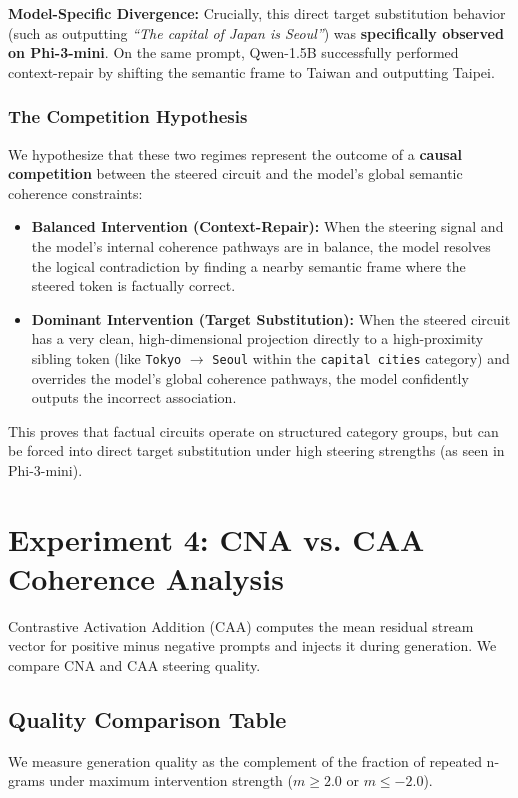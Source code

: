 \documentclass[11pt]{article}
\begin{document}
\textbf{Model-Specific Divergence:} Crucially, this direct target substitution behavior (such as outputting \textit{``The capital of Japan is Seoul''}) was \textbf{specifically observed on Phi-3-mini}. On the same prompt, Qwen-1.5B successfully performed context-repair by shifting the semantic frame to Taiwan and outputting Taipei.

\subsubsection{The Competition Hypothesis}
We hypothesize that these two regimes represent the outcome of a \textbf{causal competition} between the steered circuit and the model's global semantic coherence constraints:
\begin{itemize}
    \item \textbf{Balanced Intervention (Context-Repair):} When the steering signal and the model's internal coherence pathways are in balance, the model resolves the logical contradiction by finding a nearby semantic frame where the steered token is factually correct.
    \item \textbf{Dominant Intervention (Target Substitution):} When the steered circuit has a very clean, high-dimensional projection directly to a high-proximity sibling token (like \texttt{Tokyo} $\rightarrow$ \texttt{Seoul} within the \texttt{capital cities} category) and overrides the model's global coherence pathways, the model confidently outputs the incorrect association.
\end{itemize}
This proves that factual circuits operate on structured category groups, but can be forced into direct target substitution under high steering strengths (as seen in Phi-3-mini).

\section{Experiment 4: CNA vs. CAA Coherence Analysis}

Contrastive Activation Addition (CAA) computes the mean residual stream vector for positive minus negative prompts and injects it during generation. We compare CNA and CAA steering quality.

\subsection{Quality Comparison Table}

We measure generation quality as the complement of the fraction of repeated n-grams under maximum intervention strength ($m \ge 2.0$ or $m \le -2.0$).
\end{document}
